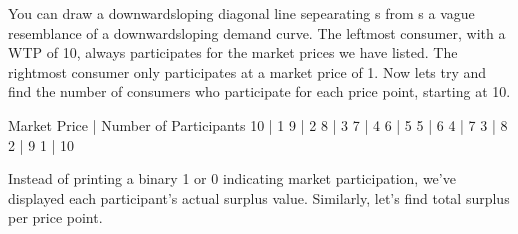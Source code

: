 \documentclass[letterpaper,10pt,english]{jupyterBook}
\begin{document}
\sphinxAtStartPar
You can draw a downward\sphinxhyphen{}sloping diagonal line sepearating s from s \sphinxhyphen{} a vague resemblance of a downward\sphinxhyphen{}sloping demand curve. The left\sphinxhyphen{}most consumer, with a WTP of 10, always participates for the market prices we have listed. The right\sphinxhyphen{}most consumer only participates at a market price of 1. Now lets try and find the number of consumers who participate for each price point, starting at 10.

\begin{sphinxVerbatim}[commandchars=\\\{\}]
     
   
                      \PYG{p}{[}    \PYG{p}{]} 
\end{sphinxVerbatim}

\begin{sphinxVerbatim}[commandchars=\\\{\}]
Market Price | Number of Participants
10           | 1
9            | 2
8            | 3
7            | 4
6            | 5
5            | 6
4            | 7
3            | 8
2            | 9
1            | 10
\end{sphinxVerbatim}

\sphinxAtStartPar
Instead of printing a binary 1 or 0 indicating market participation, we’ve displayed each participant’s actual surplus value. Similarly, let’s find total surplus per price point.
\end{document}
